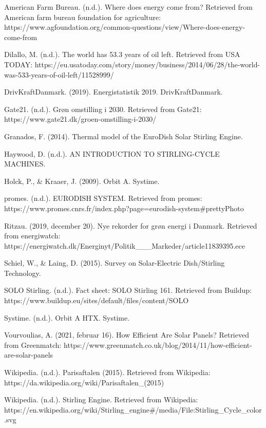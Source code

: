 \documentclass[SRC.tex]{subfiles}
\begin{document}
	​American Farm Bureau. (n.d.). Where does energy come from? Retrieved from American farm bureau foundation for agriculture: https://www.agfoundation.org/common-questions/view/Where-does-energy-come-from 
	
	Dilallo, M. (n.d.). The world has 53.3 years of oil left. Retrieved from USA TODAY: https://eu.usatoday.com/story/money/business/2014/06/28/the-world-was-533-years-of-oil-left/11528999/ 
	
	DrivKraftDanmark. (2019). Energistatistik 2019. DrivKraftDanmark. 
	
	Gate21. (n.d.). Grøn omstilling i 2030. Retrieved from Gate21: https://www.gate21.dk/groen-omstilling-i-2030/ 
	
	Granados, F. (2014). Thermal model of the EuroDish Solar Stirling Engine.  
	
	Haywood, D. (n.d.). AN INTRODUCTION TO STIRLING-CYCLE MACHINES.  
	
	Holck, P., & Kraaer, J. (2009). Orbit A. Systime. 
	
	promes. (n.d.). EURODISH SYSTEM. Retrieved from promes: https://www.promes.cnrs.fr/index.php?page=eurodish-system#prettyPhoto 
	
	Ritzau. (2019, december 20). Nye rekorder for grøn energi i Danmark. Retrieved from energiwatch: https://energiwatch.dk/Energinyt/Politik___Markeder/article11839395.ece 
	
	Schiel, W., & Laing, D. (2015). Survey on Solar-Electric Dish/Stirling Technology.  
	
	SOLO Stirling. (n.d.). Fact sheet: SOLO Stirling 161. Retrieved from Buildup: https://www.buildup.eu/sites/default/files/content/SOLO%
	
	Systime. (n.d.). Orbit A HTX. Systime. 
	
	Vourvoulias, A. (2021, februar 16). How Efficient Are Solar Panels? Retrieved from Greenmatch: https://www.greenmatch.co.uk/blog/2014/11/how-efficient-are-solar-panels 
	
	Wikipedia. (n.d.). Parisaftalen (2015). Retrieved from Wikipedia: https://da.wikipedia.org/wiki/Parisaftalen_(2015) 
	
	Wikipedia. (n.d.). Stirling Engine. Retrieved from Wikipedia: https://en.wikipedia.org/wiki/Stirling_engine#/media/File:Stirling_Cycle_color.svg 
\end{document}
